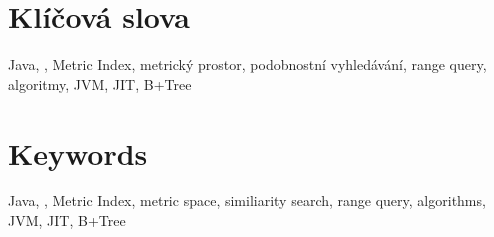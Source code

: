 \section*{Klíčová slova}
Java, \MIndex, Metric Index, metrický prostor, podobnostní vyhledávání, range query, algoritmy, JVM, JIT, B+Tree
\section*{Keywords}
Java, \MIndex, Metric Index, metric space, similiarity search, range query, algorithms, JVM, JIT, B+Tree
\newpage